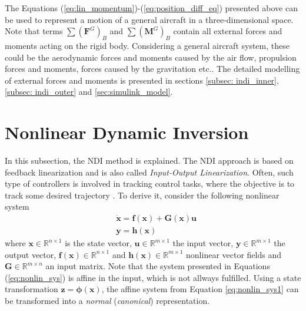 \documentclass[11pt, a4paper, twoside]{report}
\begin{document}
The Equations (\ref{eq:lin_momentum})-(\ref{eq:position_diff_eq}) presented above can be used to represent a motion of a general aircraft in a three-dimensional space. Note that terms $\sum(\bm{F}^G)_B$ and $\sum (\bm{M}^G)_B$ contain all external forces and moments acting on the rigid body. Considering a general aircraft system, these could be the aerodynamic forces and moments caused by the air flow, propulsion forces and moments, forces caused by the gravitation etc.. The detailed modelling of external forces and moments is presented in sections \ref{subsec: indi_inner}, \ref{subsec: indi_outer} and \ref{sec:simulink_model}.

\section{Nonlinear Dynamic Inversion} \label{sec:ndi}

In this subsection, the \acrlong{NDI} method is explained. The \acrshort{NDI} approach is based on feedback linearization and is also called \textit{Input-Output Linearization}. Often, such type of controllers is involved in tracking control tasks, where the objective is to track some desired trajectory \cite{Slotine}. To derive it, consider the following nonlinear system
\begin{subequations}
	\begin{align}
		&\bm{\dot{x}} = \bm{f}(\bm{x}) + \bm{G}(\bm{x})\bm{u} \label{eq:nonlin_sys1} \\
		&\bm{y} = \bm{h}(\bm{x}) \label{eq:nonlin_sys2}
	\end{align}
	\label{eq:nonlin_sys}
\end{subequations}
\hspace{-5pt}where $\bm{x} \in \mathbb{R}^{n \times 1}$ is the state vector, $\bm{u} \in \mathbb{R}^{m \times 1}$ the input vector, $\bm{y} \in \mathbb{R}^{m \times 1}$ the output vector, $\bm{f}(\bm{x}) \in \mathbb{R}^{n \times 1}$ and $\bm{h}(\bm{x}) \in \mathbb{R}^{m \times 1}$ nonlinear vector fields and $\bm{G} \in \mathbb{R}^{m \times n}$ an input matrix. Note that the system presented in Equations (\ref{eq:nonlin_sys}) is affine in the input, which is not allways fulfilled. Using a state transformation $\bm{z} = \bm{\phi}(\bm{x})$, the affine system from Equation \ref{eq:nonlin_sys1} can be transformed into a \textit{normal} (\textit{canonical}) representation. 
\end{document}
